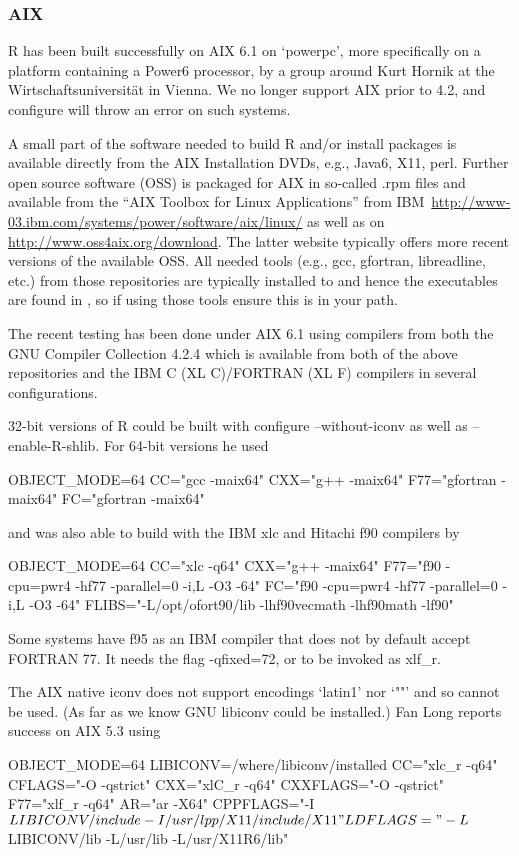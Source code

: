 \subsubsection{AIX}

R has been built successfully on AIX 6.1 on `powerpc', more
specifically on a platform containing a Power6 processor, by a group
around Kurt Hornik at the Wirtschaftsuniversit\"at in Vienna. We no
longer support AIX prior to 4.2, and configure will throw an 
error on such systems. 

A small part of the software needed to build R and/or install packages
is available directly from the AIX Installation DVDs, e.g., Java6,
X11, perl. Further open source software (OSS) is packaged for AIX in so-called
.rpm files and available from
the ``AIX Toolbox for Linux Applications'' from
IBM~\url{http://www-03.ibm.com/systems/power/software/aix/linux/} as
well as on \url{http://www.oss4aix.org/download}. The latter website typically
offers more recent versions of the available OSS. All needed tools
(e.g., gcc, gfortran, libreadline, etc.)
from those repositories are typically installed to
 and hence the executables are found in
, so if using those tools ensure this is in
your path. 

The recent testing has been done under AIX 6.1 using
compilers from both the GNU Compiler Collection 4.2.4 which is
available from both of the above repositories and the IBM C (XL
C)/FORTRAN (XL F) compilers in several configurations.



32-bit versions of R could be built with configure --without-iconv as well as --enable-R-shlib. For 64-bit versions he used

     OBJECT_MODE=64
     CC="gcc -maix64"
     CXX="g++ -maix64"
     F77="gfortran -maix64"
     FC="gfortran -maix64"

and was also able to build with the IBM xlc and Hitachi f90 compilers by

     OBJECT_MODE=64
     CC="xlc -q64"
     CXX="g++ -maix64"
     F77="f90 -cpu=pwr4 -hf77 -parallel=0 -i,L -O3 -64"
     FC="f90 -cpu=pwr4 -hf77 -parallel=0 -i,L -O3 -64"
     FLIBS="-L/opt/ofort90/lib -lhf90vecmath -lhf90math -lf90"

Some systems have f95 as an IBM compiler that does not by default accept FORTRAN 77. It needs the flag -qfixed=72, or to be invoked as xlf_r.

The AIX native iconv does not support encodings `latin1' nor `""' and so cannot be used. (As far as we know GNU libiconv could be installed.) Fan Long reports success on AIX 5.3 using

     OBJECT_MODE=64
     LIBICONV=/where/libiconv/installed
     CC="xlc_r -q64"
     CFLAGS="-O -qstrict"
     CXX="xlC_r -q64"
     CXXFLAGS="-O -qstrict"
     F77="xlf_r -q64"
     AR="ar -X64"
     CPPFLAGS="-I$LIBICONV/include -I/usr/lpp/X11/include/X11"
     LDFLAGS="-L$LIBICONV/lib -L/usr/lib -L/usr/X11R6/lib"
